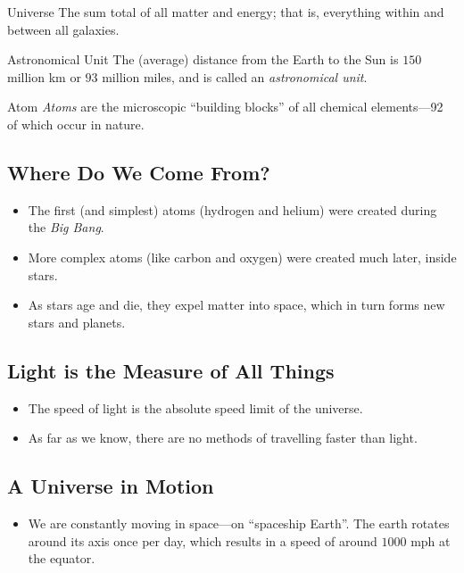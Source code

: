 \documentclass[class=article, crop=false]{standalone}
\begin{document}
  \begin{definition}{Universe}
    The sum total of all matter and energy; that is, everything within and between all galaxies.
  \end{definition}
  \begin{definition}{Astronomical Unit}
    The (average) distance from the Earth to the Sun is $150$ million km or $93$ million miles, and is called an \emph{astronomical unit}.
  \end{definition}
  \begin{definition}{Atom}
    \emph{Atoms} are the microscopic ``building blocks'' of all chemical elements---92 of which occur in nature.
  \end{definition}
  \subsection{Where Do We Come From?}
  \begin{itemize}
    \item The first (and simplest) atoms (hydrogen and helium) were created during the \emph{Big Bang}.
    \item More complex atoms (like carbon and oxygen) were created much later, inside stars.
    \item As stars age and die, they expel matter into space, which in turn forms new stars and planets.
  \end{itemize}
  \subsection{Light is the Measure of All Things}
  \begin{itemize}
    \item The speed of light is the absolute speed limit of the universe.
    \item As far as we know, there are no methods of travelling faster than light.
  \end{itemize}
  \subsection{A Universe in Motion}
  \begin{itemize}
    \item We are constantly moving in space---on ``spaceship Earth''. The earth rotates around its axis once per day, which results in a speed of around $1000$ mph at the equator.
  \end{itemize}
\end{document}
